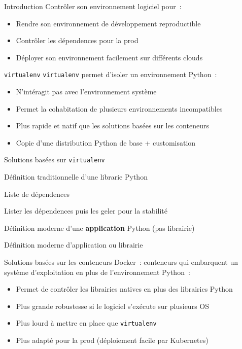 \begin{frame}{Introduction}
  Contrôler son environnement logiciel pour~:
  \begin{itemize}[<+->]
    \item Rendre son environnement de développement reproductible
    \item Contrôler les dépendences pour la prod
    \item Déployer son environnement facilement sur différents clouds
  \end{itemize}
\end{frame}

\begin{frame}{\texttt{virtualenv}}
  \texttt{virtualenv} permet d'isoler un environnement Python~:
  \begin{itemize}[<+->]
    \item N'intéragit pas avec l'environnement système
    \item Permet la cohabitation de plusieurs environnements incompatibles
    \item Plus rapide et natif que les solutions basées sur les conteneurs
    \item Copie d'une distribution Python de base + customisation
  \end{itemize}
\end{frame}

\begin{frame}{Solutions basées sur \texttt{virtualenv}}
  \begin{description}[<+->]
    \item[pip + setup.py] Définition traditionnelle d'une librarie Python
    \item[pip + requirements.txt] Liste de dépendences
    \item[pip + pip-compile] Lister les dépendences puis les geler pour la stabilité
    \item[Pipenv] Définition moderne d'une \textbf{application} Python (pas librairie)
    \item[poetry] Définition moderne d'application ou librairie
  \end{description}
\end{frame}

\begin{frame}{Solutions basées sur les conteneurs}
  Docker~: conteneurs qui embarquent un système d'exploitation en plus de l'environnement Python~:
  \begin{itemize}[<+->]
    \item Permet de contrôler les librairies natives en plus des librairies Python
    \item Plus grande robustesse si le logiciel s'exécute sur plusieurs OS
    \item Plus lourd à mettre en place que \texttt{virtualenv}
    \item Plus adapté pour la prod (déploiement facile par Kubernetes)
  \end{itemize}
\end{frame}